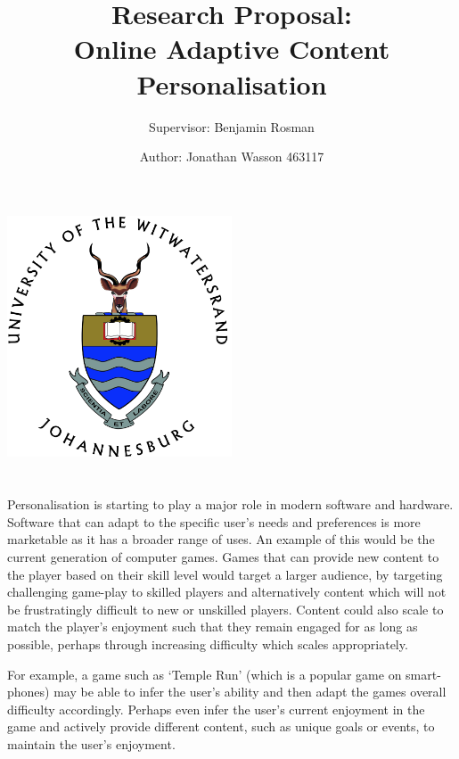 \documentclass[11pt]{article}
\title{Research Proposal:\\ Online Adaptive Content Personalisation}
\subtitle{Supervisor: Benjamin Rosman}
\author{Author: Jonathan Wasson 463117}
\begin{document}
\nocite{*}
    
\begin{titlepage}
\maketitle
\thispagestyle{empty}
\setcounter{page}{0}

\begin{center}
    \includegraphics[width=0.5\textwidth]{WITS-logo.jpg}
\end{center}

\clearpage



\section*{}

Personalisation is starting to play a major role in modern software and hardware. Software that can adapt to the specific user's needs and preferences is more marketable as it has a broader range of uses. An example of this would be the current generation of computer games. Games that can provide new content to the player based on their skill level would target a larger audience, by targeting challenging game-play to skilled players and alternatively content which will not be frustratingly difficult to new or unskilled players. Content could also scale to match the player's enjoyment such that they remain engaged for as long as possible, perhaps through increasing difficulty which scales appropriately. 

\vspace{6.0 mm}

For example, a game such as `Temple Run' (which is a popular game on smart-phones) may be able to infer the user's ability and then adapt the games overall difficulty accordingly. Perhaps even infer the user's current enjoyment in the game and actively provide different content, such as unique goals or events, to maintain the user's enjoyment.


\end{titlepage}
\end{document}
